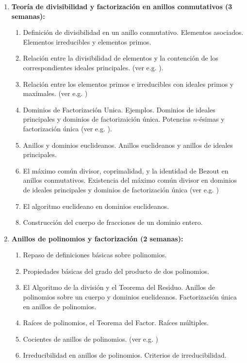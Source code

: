 \begin{refsection}
\begin{enumerate}
\item \textbf{Teoría de divisibilidad y factorización en anillos conmutativos (3 semanas):} 
\begin{enumerate}
    \item Definición de divisibilidad en un anillo conmutativo. Elementos asociados. Elementos irreducibles y elementos primos.
    \item Relación entre la divisibilidad de elementos y la contención de los correspondientes ideales principales. (ver e.g. \cite[Teorema II.3.2, pág. 136]{Hun80}).
    \item Relación entre los elementos primos e irreducibles con ideales primos y maximales. (ver e.g. \cite[Teorema II.3.4, pág. 136]{Hun80})
    \item Dominios de Factorización Unica. Ejemplos. Dominios de ideales principales y dominios de factorizaición única. Potencias $n$-ésimas y factorización única (ver e.g. \cite[Lema 6.41, pág. 120]{Alu21}).
    \item Anillos y dominios euclideanos. Anillos euclideanos y anillos de ideales principales. 
    \item El máximo común divisor, coprimalidad, y la identidad de Bezout en anillos conmutativos. Existencia del máximo común divisor en dominios de ideales principales y dominios de factorización única (ver e.g. \cite[Teorema II.3.11, pág. 140]{Hun80})
    \item El algoritmo euclideano en dominios euclideanos.
    \item Construcción del cuerpo de fracciones de un dominio entero.
\end{enumerate}

\item \textbf{Anillos de polinomios y factorización (2 semanas):} 
\begin{enumerate}
    \item Repaso de definiciones básicas sobre polinomios.
    \item Propiedades básicas del grado del producto de dos polinomios.
    \item El Algoritmo de la división y el Teorema del Residuo. Anillos de polinomios sobre un cuerpo y dominios euclideanos. Factorización única en anillos de polinomios.
    \item Raíces de polinomios, el Teorema del Factor. Raíces múltiples.
    \item Cocientes de anillos de polinomios. (ver e.g. \cite[Corolario 7.10 y Teorema 7.11, pág. 135]{Alu21})
    \item Irreducibilidad en anillos de polinomios. Criterios de irreducibilidad. 
\end{enumerate}


\end{enumerate}
\end{refsection}
